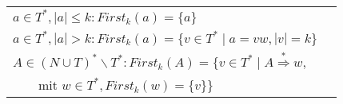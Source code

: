 \documentclass[
    border=0.2cm,
    convert={density=600}
]{standalone}
\begin{document}
	\begin{tabular}{lp{11 cm}}
$a \in T^*, |a| \leq k: {First}_k (a) = \{a\}$\\
$a \in T^*, |a| > k: {First}_k (a) = \lbrace v \in T^* \mid a = vw, |v| = k\rbrace$\\
$A \in (N \cup T)^* \backslash T^*: {First}_k (A) = \{v \in T^* \mid  A \overset{*}{\Rightarrow} w,$\\
\ \ \ \ mit $w \in T^*, First_k(w) = \{ v \}\}$
\end{tabular}
\end{document}
